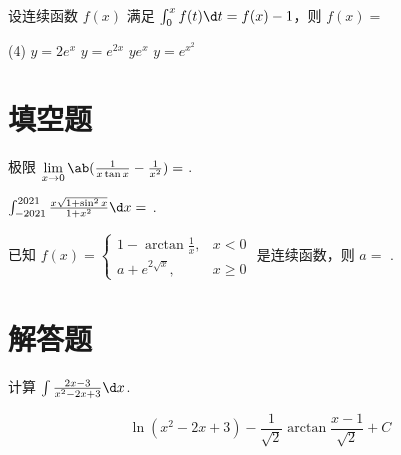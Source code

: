 \documentclass[quiet]{ctexart}
\begin{document}
\begin{problem}
  设连续函数 $f(x)$ 满足 $\int_0^x f(t) \d t = f(x) - 1$，则 $f(x) = $
  \begin{tasks}(4)
    \task $y = 2e^x$
    \task $y = e^{2x}$
    \task $y  e^x$
    \task $y = e^{x^2}$
  \end{tasks}
\end{problem}
\begin{solution}
  
\end{solution}

\section{填空题}

\begin{problem}
  极限 $\lim\limits_{x \to 0} \ab(\frac{1}{x\tan x} - \frac{1}{x^2}) = $
  .
\end{problem}
\begin{solution}
  
\end{solution}

\begin{problem}
  $\int_{-2021}^{2021} \frac{x\sqrt{1 + \sin^2 x}}{1 + x^2} \d x = $
  .
\end{problem}
\begin{solution}
  
\end{solution}

\begin{problem}
  已知 $f(x) =
  \begin{cases}
    1 - \arctan \frac1x, & x < 0\\
    a + e^{2\sqrt x},    & x \geq 0
  \end{cases}$
  是连续函数，则 $a = $ .
\end{problem}
\begin{solution}
  
\end{solution}

\section{解答题}

\begin{problem}
  计算 $\int \frac{2x - 3}{x^2 - 2x + 3} \d x$.
\end{problem}
\begin{solution}
  \[\ln(x^2 -2x + 3) - \frac{1}{\sqrt2} \arctan \frac{x - 1}{\sqrt2} + C\]
\end{solution}
\end{document}

